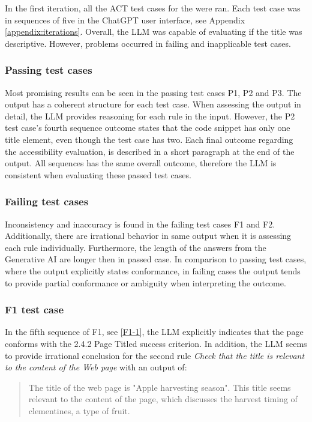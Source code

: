 In the first iteration, all the ACT test cases for the \textcite{act_rule_g88} were ran. Each test case was in sequences of five in the ChatGPT user interface, see Appendix \ref{appendix:iterations}. Overall, the LLM was capable of evaluating if the title was descriptive. However, problems occurred in failing and inapplicable test cases.

\subsubsection{Passing test cases}

Most promising results can be seen in the passing test cases P1, P2 and P3. The output has a coherent structure for each test case. When assessing the output in detail, the LLM provides reasoning for each rule in the input. However, the P2 test case's fourth sequence outcome states that the code snippet has only one title element, even though the test case has two. Each final outcome regarding the accessibility evaluation, is described in a short paragraph at the end of the output. All sequences has the same overall outcome, therefore the LLM is consistent when evaluating these passed test cases.

\subsubsection{Failing test cases}

Inconsistency and inaccuracy is found in the failing test cases F1 and F2. Additionally, there are irrational behavior in same output when it is assessing each rule individually. Furthermore, the length of the answers from the Generative AI are longer then in passed case. In comparison to passing test cases, where the output explicitly states conformance, in failing cases the output tends to provide partial conformance or ambiguity when interpreting the outcome. 

\subsubsection{F1 test case}

In the fifth sequence of F1, see \ref{F1-1}, the LLM explicitly indicates that the page conforms with the 2.4.2 Page Titled success criterion. In addition, the LLM seems to provide irrational conclusion for the second rule \textit{Check that the title is relevant to the content of the Web page} with an output of:

\begin{quote}
    The title of the web page is "Apple harvesting season". This title seems relevant to the content of the page, which discusses the harvest timing of clementines, a type of fruit.
\end{quote}

